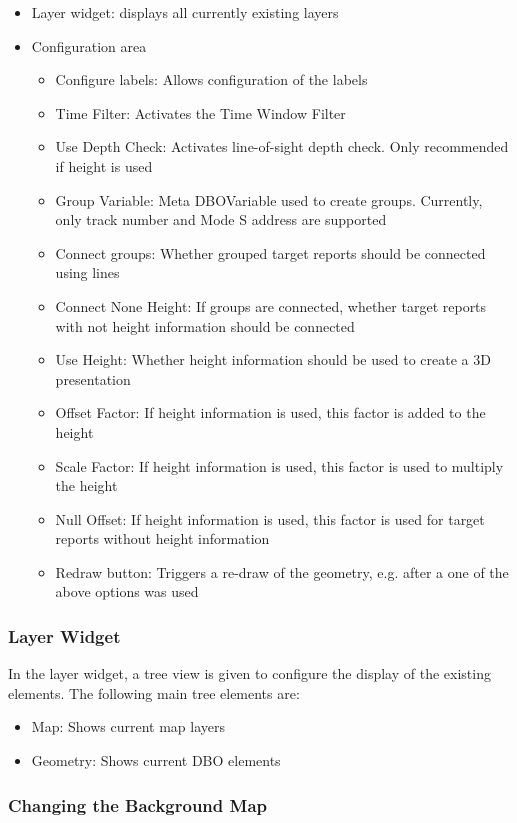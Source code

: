 \begin{itemize}
 \item Layer widget: displays all currently existing layers
 \item Configuration area
\begin{itemize}
 \item Configure labels: Allows configuration of the labels
 \item Time Filter: Activates the Time Window Filter
 \item Use Depth Check: Activates line-of-sight depth check. Only recommended if height is used
 \item Group Variable: Meta DBOVariable used to create groups. Currently, only track number and Mode S address are supported
 \item Connect groups: Whether grouped target reports should be connected using lines
 \item Connect None Height: If groups are connected, whether target reports with not height information should be connected
 \item Use Height: Whether height information should be used to create a 3D presentation
 \item Offset Factor: If height information is used, this factor is added to the height
 \item Scale Factor: If height information is used, this factor is used to multiply the height
 \item Null Offset: If height information is used, this factor is used for target reports without height information
 \item Redraw button: Triggers a re-draw of the geometry, e.g. after a one of the above options was used
\end{itemize}
\end{itemize}

\subsubsection{Layer Widget}

In the layer widget, a tree view is given to configure the display of the existing elements. The following main tree elements are:
\begin{itemize}
 \item Map: Shows current map layers
 \item Geometry: Shows current DBO elements
\end{itemize}

\subsubsection{Changing the Background Map}

